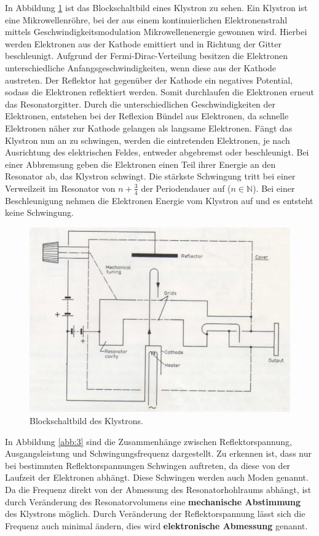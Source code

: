 In Abbildung \ref{abb:2} ist das Blockschaltbild eines Klystron zu sehen.
Ein Klystron ist eine Mikrowellenröhre, bei der aus einem kontinuierlichen
Elektronenstrahl mittels Geschwindigkeitsmodulation Mikrowellenenergie gewonnen
wird. Hierbei werden Elektronen aus der Kathode emittiert und in Richtung der
Gitter beschleunigt.
Aufgrund der Fermi-Dirac-Verteilung besitzen die Elektronen unterschiedliche
Anfangsgeschwindigkeiten, wenn diese aus der Kathode austreten. Der Reflektor
hat gegenüber der Kathode ein negatives Potential, sodass die Elektronen
reflektiert werden. Somit durchlaufen die Elektronen erneut das Resonatorgitter.
Durch die unterschiedlichen Geschwindigkeiten der Elektronen, entstehen bei der
Reflexion Bündel aus Elektronen, da schnelle Elektronen näher zur Kathode
gelangen als langsame Elektronen.
Fängt das Klystron nun an zu schwingen, werden die eintretenden Elektronen, je
nach Ausrichtung des elektrischen Feldes, entweder abgebremst oder beschleunigt.
Bei einer Abbremsung geben die Elektronen einen Teil ihrer Energie an den
Resonator ab, das Klystron schwingt. Die stärkste Schwingung tritt bei einer
Verweilzeit im Resonator von $n+\frac{3}{4}$ der Periodendauer auf
($n \in \mathbb{N}$). Bei einer Beschleunigung nehmen die Elektronen Energie
vom Klystron auf und es entsteht keine Schwingung.

\begin{figure}
  \centering
  \includegraphics[scale=0.4]{Blockschaltbild.png}
  \caption{Blockschaltbild des Klystrons.\cite{Q1}}
  \label{abb:2}
\end{figure}

In Abbildung \ref{abb:3} sind die Zusammenhänge zwischen Reflektorspannung,
Ausgangsleistung und Schwingungsfrequenz dargestellt. Zu erkennen ist, dass nur
bei bestimmten Reflektorspannungen Schwingen auftreten, da diese von der
Laufzeit der Elektronen abhängt. Diese Schwingen werden auch Moden genannt.
Da die Frequenz direkt von der Abmessung des Resonatorhohlraums abhängt, ist
durch Veränderung des Resonatorvolumens eine \textbf{mechanische Abstimmung} des
Klystrons möglich. Durch Veränderung der Reflektorspannung lässt sich die
Frequenz auch minimal ändern, dies wird \textbf{elektronische Abmessung} genannt.


